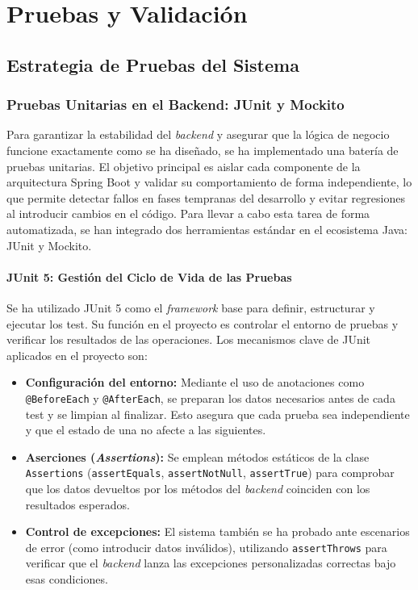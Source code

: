 \chapter{Pruebas y Validación}
\section{Estrategia de Pruebas del Sistema}

\subsection{Pruebas Unitarias en el Backend: JUnit y Mockito}

Para garantizar la estabilidad del \textit{backend} y asegurar que la lógica de negocio funcione exactamente como se ha diseñado, se ha implementado una batería de pruebas unitarias. El objetivo principal es aislar cada componente de la arquitectura Spring Boot y validar su comportamiento de forma independiente, lo que permite detectar fallos en fases tempranas del desarrollo y evitar regresiones al introducir cambios en el código. Para llevar a cabo esta tarea de forma automatizada, se han integrado dos herramientas estándar en el ecosistema Java: JUnit y Mockito.

\subsubsection{JUnit 5: Gestión del Ciclo de Vida de las Pruebas}
Se ha utilizado JUnit 5  como el \textit{framework} base para definir, estructurar y ejecutar los test. Su función en el proyecto es controlar el entorno de pruebas y verificar los resultados de las operaciones. Los mecanismos clave de JUnit aplicados en el proyecto son:
\begin{itemize}
    \item \textbf{Configuración del entorno:} Mediante el uso de anotaciones como \texttt{@BeforeEach} y \texttt{@AfterEach}, 
    se preparan los datos necesarios antes de cada test y se limpian al finalizar. Esto asegura que cada prueba sea independiente y 
    que el estado de una no afecte a las siguientes.
    \item \textbf{Aserciones (\textit{Assertions}):} Se emplean métodos estáticos de la clase \texttt{Assertions} (\texttt{assertEquals}, \texttt{assertNotNull}, \texttt{assertTrue}) para comprobar que los datos devueltos por los métodos del \textit{backend} coinciden con los resultados esperados.
    \item \textbf{Control de excepciones:} El sistema también se ha probado ante escenarios de error (como introducir datos inválidos), utilizando \texttt{assertThrows} para verificar que el \textit{backend} lanza las excepciones personalizadas correctas bajo esas condiciones.
\end{itemize}

